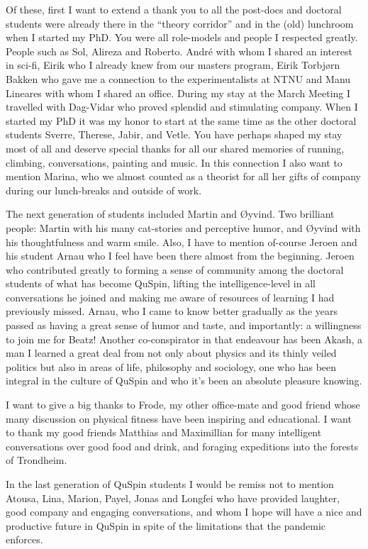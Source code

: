 Of these, first I want to extend a thank you to all the post-docs and doctoral students were already there in the ``theory corridor'' and in the
(old) lunchroom when I started my PhD. You were all
role-models and people I respected greatly. People such as Sol, Alireza and Roberto. Andr\'e with whom I shared an interest in sci-fi, Eirik
who I already knew from our masters program, Eirik Torbjørn Bakken who gave me a connection to the experimentalists at NTNU and Manu Lineares
with whom I shared an office. During my stay at the March Meeting I travelled with Dag-Vidar who proved splendid and
stimulating company.
When I started my PhD it was my honor to start at the same time as the other doctoral students Sverre, Therese, Jabir, and Vetle.
You have perhaps shaped my stay most of all and deserve special thanks for all our shared memories of running, climbing,
conversations, painting and music. In this connection I also want to mention Marina, who we almost counted as a theorist
for all her gifts of company during our lunch-breaks and outside of work.

The next generation of students included Martin and Øyvind. Two brilliant people: Martin with his many cat-stories and
perceptive humor, and Øyvind with his thoughtfulness and warm smile. Also, I have to mention of-course Jeroen and his student
Arnau who I feel have been there almost from the beginning. Jeroen who contributed greatly to forming a sense
of community among the doctoral students of what has become QuSpin, lifting the intelligence-level in all conversations
he joined and making me aware of resources of learning I had previously missed. Arnau, who I came to know better gradually as the
years passed as having a great sense of humor and taste, and importantly: a willingness to join me for Beatz! Another
co-conspirator in that endeavour has been Akash, a man I learned a great deal from not only about physics and its
thinly veiled politics but also in areas of life, philosophy and sociology, one who has been integral in the culture
of QuSpin and who it's been an absolute pleasure knowing.

I want to give a big thanks to Frode, my other office-mate and good friend whose many discussion on physical fitness
have been inspiring and educational. I want to thank my good friends Matthias and Maximillian for many intelligent
conversations over good food and drink, and foraging expeditions into the forests of Trondheim.

In the last generation of QuSpin students I would be remiss not to mention Atousa, Lina, Marion, Payel, Jonas and Longfei
who have provided laughter, good company and engaging conversations, and whom I hope will have a
nice and productive future in QuSpin in spite of the limitations that the pandemic enforces.

